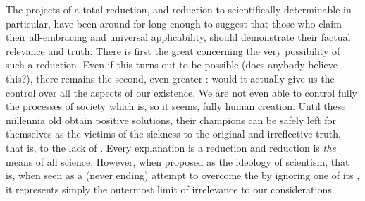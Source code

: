 The projects of a total reduction, and reduction to scientifically determinable
 in particular, have been around for long enough to suggest that
those who claim their all-embracing and universal applicability, should demonstrate
their factual relevance and truth. There is first the great  concerning
the very possibility of such a reduction. Even if this turns out to be possible
(does anybody believe this?), there remains the second, even greater :
would it actually give us the control over all the aspects of our existence. We
are not even able to control fully the processes of society which is, so it
seems, fully human creation.  Until these millennia old  obtain positive
solutions, their champions can be safely left for themselves as the victims of
the  sickness to the {original and irreflective truth}, that is,
to the lack of . Every explanation is a reduction and
reduction is {\em the} means of all science. However, when proposed as the
ideology of scientism, that is, when seen as a (never ending) attempt to
overcome the  by ignoring one of its , it
represents simply the outermost limit of irrelevance to our considerations.


